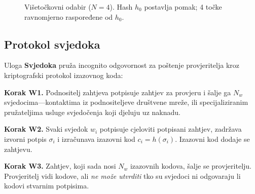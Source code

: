 \documentclass[11pt,a4paper,twocolumn]{article}
\begin{document}
\begin{figure}[ht]
\centering
{}
\caption{Višetočkovni odabir ($N{=}4$). Hash $h_0$ postavlja pomak; 4 točke ravnomjerno raspoređene od $h_0$.}
\label{fig:multipoint}
\end{figure}

\subsection{Protokol svjedoka}

Uloga \textbf{Svjedoka} pruža incognito odgovornost za poštenje provjeritelja kroz kriptografski protokol izazovnog koda:

\textbf{Korak W1.} Podnositelj zahtjeva potpisuje zahtjev za provjeru i šalje ga $N_w$ svjedocima---kontaktima iz podnositeljeve društvene mreže, ili specijaliziranim pružateljima usluge svjedočenja koji djeluju uz naknadu.

\textbf{Korak W2.} Svaki svjedok $w_i$ potpisuje cjeloviti potpisani zahtjev, zadržava izvorni potpis $\sigma_i$ i izračunava izazovni kod $c_i = h(\sigma_i)$. Izazovni kod dodaje se zahtjevu.

\textbf{Korak W3.} Zahtjev, koji sada nosi $N_w$ izazovnih kodova, šalje se provjeritelju. Provjeritelj vidi kodove, ali \emph{ne može utvrditi} tko su svjedoci ni odgovaraju li kodovi stvarnim potpisima.
\end{document}

